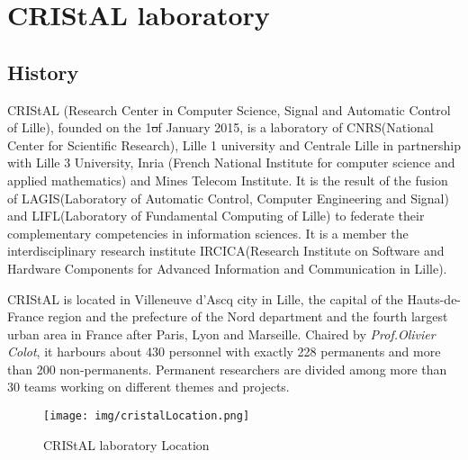 \chapter{CRIStAL laboratory}

\section{History}

CRIStAL\footnotemark[1]\cite{cristal} (Research Center in Computer Science, Signal and Automatic Control of Lille), founded on the 1\st of January 2015, is a laboratory of CNRS\footnotemark[2] (National Center for Scientific Research), Lille 1 university and Centrale Lille in partnership with Lille 3 University, Inria (French National Institute for computer science and applied mathematics) and Mines Telecom Institute. It is the result of the fusion of LAGIS\footnotemark[4] (Laboratory of Automatic Control, Computer Engineering and Signal) and LIFL\footnotemark[4] (Laboratory of Fundamental Computing of Lille) to federate their complementary competencies in information sciences. It is a member the interdisciplinary research institute IRCICA\footnotemark[5] (Research Institute on Software and Hardware Components for Advanced Information and Communication in Lille). \\






CRIStAL is located in Villeneuve d'Ascq city in Lille, the capital of  the Hauts-de-France region and the prefecture of the Nord department and the fourth largest urban area in France after Paris, Lyon and Marseille. Chaired by \textit{Prof.Olivier Colot}, it harbours about 430 personnel with exactly 228 permanents and more than 200 non-permanents. Permanent researchers are divided among more than 30 teams working on different themes and projects.

\begin{figure}[!ht]
	\centering
	\texttt{[image: img/cristalLocation.png]} 
	\caption{CRIStAL laboratory Location}
\end{figure}


